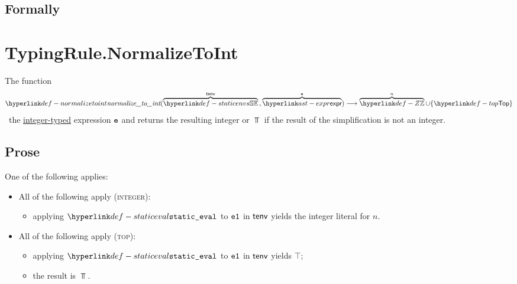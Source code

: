 \subsection{Formally}

\section{TypingRule.NormalizeToInt \label{sec:TypingRule.NormalizeToInt}}
\hypertarget{def-normalizetoint}{}
The function
\[
\normalizetoint(
  \overname{\staticenvs}{\tenv} \aslsep
  \overname{\expr}{\ve}
) \aslto \overname{\Z}{n} \cup \{\Top\}
\]
\symbolicallysimplifies\ the \underline{integer-typed} expression $\texttt{e}$ and returns the resulting integer or $\Top$ if
the result of the simplification is not an integer.

\subsection{Prose}
One of the following applies:
\begin{itemize}
  \item All of the following apply (\textsc{integer}):
  \begin{itemize}
    \item applying $\staticeval$ to $\texttt{e1}$ in $\textsf{tenv}$ yields the integer literal for $n$.
  \end{itemize}

  \item All of the following apply (\textsc{top}):
  \begin{itemize}
    \item applying $\staticeval$ to $\texttt{e1}$ in $\textsf{tenv}$ yields $\top$;
    \item the result is $\Top$.
  \end{itemize}
\end{itemize}

